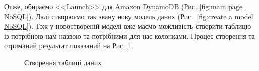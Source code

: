 \documentclass[a4paper,14pt]{extarticle} %
\begin{document}
Отже, обираємо <<Launch>> для Amazon DynamoDB (Рис. \ref{fig:main page NoSQL}). Далі створюємо так звану 
нову модель даних (Рис.~\ref{fig:create a model NoSQL}). Тож у новоствореній моделі вже маємо можливість 
створити таблицю із потрібною нам назвою та потрібними для нас колонками. Процес створення та отриманий 
результат показаний на Рис. 
\ref{fig:create a table NoSQL}. 

\begin{figure}[H]
    \begin{minipage}[H]{0.49\linewidth}
    \end{minipage}
    \hfill
    \begin{minipage}[H]{0.49\linewidth}
    \end{minipage}
    \caption{Створення таблиці даних}
    \label{fig:create a table NoSQL}
\end{figure}
\end{document}
